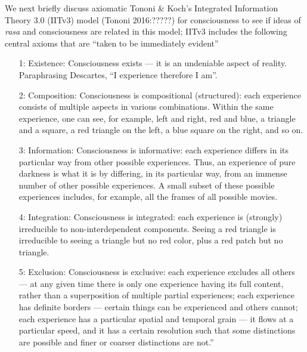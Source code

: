 We next briefly discuss axiomatic Tononi \& Koch’s Integrated Information Theory 3.0 (IITv3) model (Tononi 2016:?????) for consciousness to see if ideas of \textsl{rasa} and consciousness are related in this model; IITv3 includes the following central axioms that are “taken to be immediately evident”
\begin{itemize}
\item[1:] Existence: Consciousness exists --- it is an undeniable aspect of reality. Paraphrasing Descartes, “I experience therefore I am”. 
\item[2:] Composition: Consciousness is compositional (structured): each experience consists of multiple aspects in various combinations. Within the same experience, one can see, for example, left and right, red and blue, a triangle and a square, a red triangle on the left, a blue square on the right, and so on.
\item[3:] Information: Consciousness is informative: each experience differs in its particular way from other possible experiences. Thus, an experience of pure darkness is what it is by differing, in its particular way, from an immense number of other possible experiences. A small subset of these possible experiences includes, for example, all the frames of all possible movies.
\item[4:] Integration: Consciousness is integrated: each experience is (strongly) irreducible to non-interdependent components. Seeing a red triangle is irreducible to seeing a triangle but no red color, plus a red patch but no triangle.
\item[5:] Exclusion: Consciousness is exclusive: each experience excludes all others --- at any given time there is only one experience having its full content, rather than a superposition of multiple partial experiences; each experience has definite borders --- certain things can be experienced and others cannot; each experience has a particular spatial and temporal grain --- it flows at a particular speed, and it has a certain resolution such that some distinctions are possible and finer or coarser distinctions are not.”
\end{itemize}

